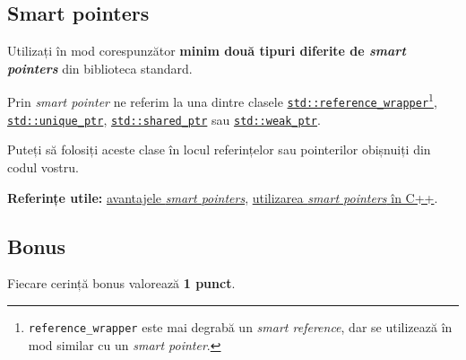 \subsection*{Smart pointers}

Utilizați în mod corespunzător \textbf{minim două tipuri diferite de \emph{smart pointers}} din biblioteca standard. 

Prin \emph{smart pointer} ne referim la una dintre clasele \href{https://en.cppreference.com/w/cpp/utility/functional/reference_wrapper}{\texttt{std::reference\_wrapper}}\footnote{\texttt{reference\_wrapper} este mai degrabă un \emph{smart reference}, dar se utilizează în mod similar cu un \emph{smart pointer}.}, \href{https://en.cppreference.com/w/cpp/memory/unique_ptr}{\texttt{std::unique\_ptr}}, \href{https://en.cppreference.com/w/cpp/memory/shared_ptr}{\texttt{std::shared\_ptr}} sau \href{https://en.cppreference.com/w/cpp/memory/weak_ptr}{\texttt{std::weak\_ptr}}.

Puteți să folosiți aceste clase în locul referințelor sau pointerilor obișnuiți din codul vostru.

\textbf{Referințe utile:} \href{https://www.geeksforgeeks.org/smart-pointers-cpp/}{avantajele \emph{smart pointers}}, \href{https://learn.microsoft.com/en-us/cpp/cpp/smart-pointers-modern-cpp?view=msvc-170}{utilizarea \emph{smart pointers} în C++}.

\subsection*{Bonus}

Fiecare cerință bonus valorează \textbf{1 punct}.

